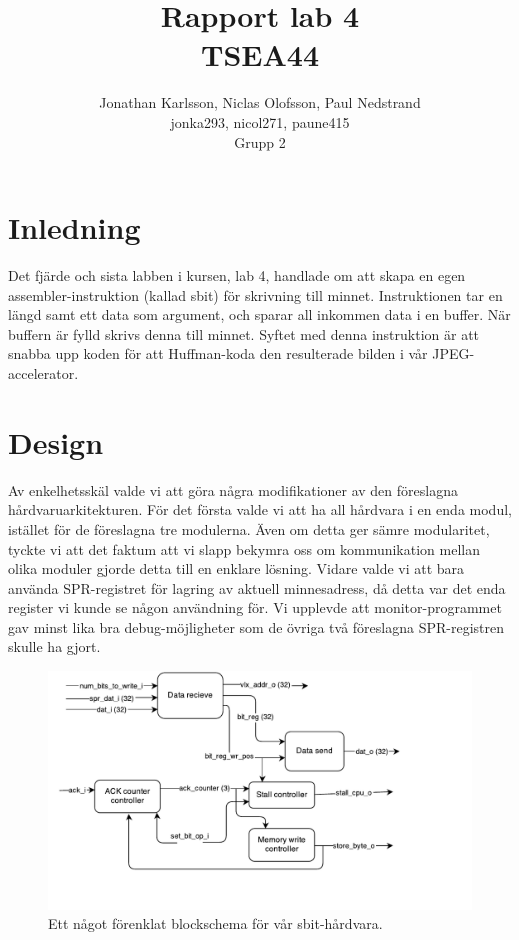 \documentclass[a4paper]{article}
\author{Jonathan Karlsson, Niclas Olofsson, Paul Nedstrand\\jonka293, nicol271, paune415\\Grupp 2}
\title{Rapport lab 4\\ \vspace{2 mm} {\large TSEA44}}
\begin{document}
\maketitle
\newpage

\tableofcontents
\newpage

\section{Inledning}

Det fjärde och sista labben i kursen, lab 4, handlade om att skapa
en egen assembler-instruktion (kallad sbit) för skrivning till minnet.
Instruktionen tar en längd samt ett data som argument, och sparar all
inkommen data i en buffer. När buffern är fylld skrivs denna till
minnet. Syftet med denna instruktion är att snabba upp koden för att
Huffman-koda den resulterade bilden i vår JPEG-accelerator.\\

\section{Design}

Av enkelhetsskäl valde vi att göra några modifikationer av den
föreslagna hårdvaruarkitekturen. För det första valde vi att ha all
hårdvara i en enda modul, istället för de föreslagna tre modulerna. Även
om detta ger sämre modularitet, tyckte vi att det faktum att vi slapp
bekymra oss om kommunikation mellan olika moduler gjorde detta till en
enklare lösning. Vidare valde vi att bara använda SPR-registret för
lagring av aktuell minnesadress, då detta var det enda register vi kunde
se någon användning för. Vi upplevde att monitor-programmet gav minst
lika bra debug-möjligheter som de övriga två föreslagna SPR-registren
skulle ha gjort.\\

\begin{figure}[H]
\centering
\includegraphics[width=1.0\textwidth]{blockschema.pdf}
\caption{Ett något förenklat blockschema för vår sbit-hårdvara.}
\label{fig:blockschema}
\end{figure}
\end{document}
